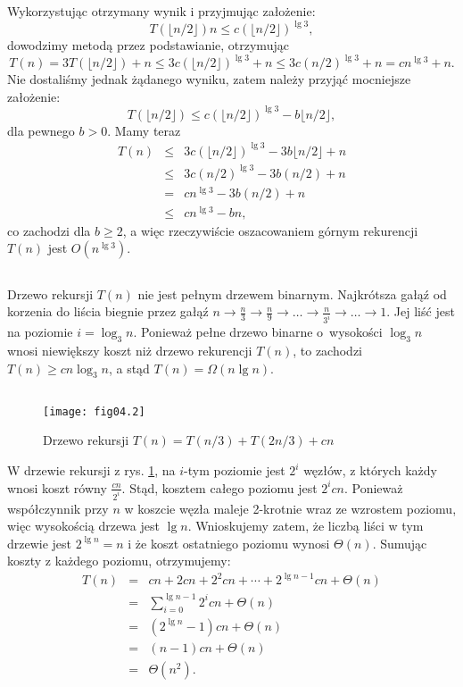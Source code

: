 Wykorzystując otrzymany wynik i przyjmując założenie:
\[
	T(\lfloor n/2\rfloor)n\le c(\lfloor n/2\rfloor)^{\lg 3},
\]
dowodzimy metodą przez podstawianie, otrzymując
\[
	T(n) = 3T(\lfloor n/2\rfloor)+n \le 3c(\lfloor n/2\rfloor)^{\lg 3}+n \le 3c(n/2)^{\lg 3}+n = cn^{\lg 3}+n.
\]
Nie dostaliśmy jednak żądanego wyniku, zatem należy przyjąć mocniejsze założenie:
\[
	T(\lfloor n/2\rfloor) \le c(\lfloor n/2\rfloor)^{\lg 3}-b\lfloor n/2\rfloor,
\]
dla pewnego $b>0$. Mamy teraz
\begin{eqnarray*}
	T(n) &\le& 3c(\lfloor n/2\rfloor)^{\lg 3}-3b\lfloor n/2\rfloor+n \\
	&\le& 3c(n/2)^{\lg 3}-3b(n/2)+n \\
	&=& cn^{\lg 3}-3b(n/2)+n \\
	&\le& cn^{\lg 3}-bn,
\end{eqnarray*}
co zachodzi dla $b\ge2$, a więc rzeczywiście oszacowaniem górnym rekurencji $T(n)$ jest $O(n^{\lg3})$.

\subsection{} %
Drzewo rekursji $T(n)$ nie jest pełnym drzewem binarnym. Najkrótsza gałąź od korzenia do liścia biegnie przez gałąź $n\to\frac{n}{3}\to\frac{n}{9}\to\dots\to\frac{n}{3^i}\to\dots\to1$. Jej liść jest na poziomie $i=\log_3n$. Ponieważ pełne drzewo binarne o~wysokości $\log_3n$ wnosi niewiększy koszt niż drzewo rekurencji $T(n)$, to zachodzi $T(n)\ge cn\log_3n$, a stąd $T(n)=\Omega(n\lg n)$.

\subsection{} %
\begin{figure}[h]
	\begin{center}
		\texttt{[image: fig04.2]}
	\end{center}
	\caption{Drzewo rekursji $T(n)=T(n/3)+T(2n/3)+cn$} \label{fig:4.2-3}
\end{figure}

W drzewie rekursji z rys. \ref{fig:4.2-3}, na $i$-tym poziomie jest $2^i$ węzłów, z których każdy wnosi koszt równy $\frac{cn}{2^i}$. Stąd, kosztem całego poziomu jest $2^icn$. Ponieważ współczynnik przy $n$ w koszcie węzła maleje 2-krotnie wraz ze wzrostem poziomu, więc wysokością drzewa jest $\lg n$. Wnioskujemy zatem, że liczbą liści w tym drzewie jest $2^{\lg n}=n$ i że koszt ostatniego poziomu wynosi $\Theta(n)$. Sumując koszty z każdego poziomu, otrzymujemy:
\begin{eqnarray*}
	T(n) &=& cn+2cn+2^2cn+\cdots+2^{\lg n-1}cn+\Theta(n) \\
	&=& \sum_{i=0}^{\lg n-1}2^icn+\Theta(n) \\
	&=& (2^{\lg n}-1)cn+\Theta(n) \\
	&=& (n-1)cn+\Theta(n) \\
	&=& \Theta(n^2).
\end{eqnarray*}

